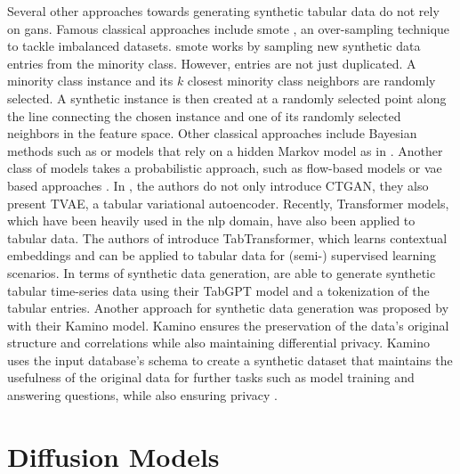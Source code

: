 Several other approaches towards generating synthetic tabular data do not rely on \glspl{gan}.
Famous classical approaches include \gls{smote} \cite{chawla2002SMOTESyntheticMinority}, an over-sampling technique to tackle imbalanced datasets.
\gls{smote} works by sampling new synthetic data entries from the minority class.
However, entries are not just duplicated.
A minority class instance and its $k$ closest minority class neighbors are randomly selected. 
A synthetic instance is then created at a randomly selected point along the line connecting the chosen instance and one of its randomly selected neighbors in the feature space.
Other classical approaches include Bayesian methods such as \cite{zhang2017PrivBayesPrivateData} or models that rely on a hidden Markov \gls{model} as in \cite{dahmen2019SynSysSyntheticData}.
Another class of models takes a probabilistic approach, such as flow-based models \cite{kamthe2021CopulaFlowsSynthetic} or \gls{vae} based approaches \cite{kingma2013AutoEncodingVariationalBayes}.
In \cite{xu2019ModelingTabularData}, the authors do not only introduce CTGAN, they also present TVAE, a tabular variational autoencoder.
Recently, Transformer models, which have been heavily used in the \gls{nlp} domain, have also been applied to tabular data.
The authors of \cite{huang2020TabTransformerTabularData} introduce TabTransformer, which learns contextual embeddings and can be applied to tabular data for (semi-) supervised learning scenarios.
In terms of synthetic data generation, \textcite{padhi2021TabularTransformersModeling} are able to generate synthetic tabular time-series data using their TabGPT \gls{model} and a tokenization of the tabular entries.
Another approach for synthetic data generation was proposed by \textcite{ge2021KaminoConstraintawareDifferentially} with their Kamino \gls{model}.
Kamino ensures the preservation of the data's original structure and correlations while also maintaining differential privacy. 
Kamino uses the input database's schema to create a synthetic dataset that maintains the usefulness of the original data for further tasks such as \gls{model} training and answering questions, while also ensuring privacy \cite{ge2021KaminoConstraintawareDifferentially}.

\section{Diffusion Models}
\label{ch:relatedWork-diffusionModels}

